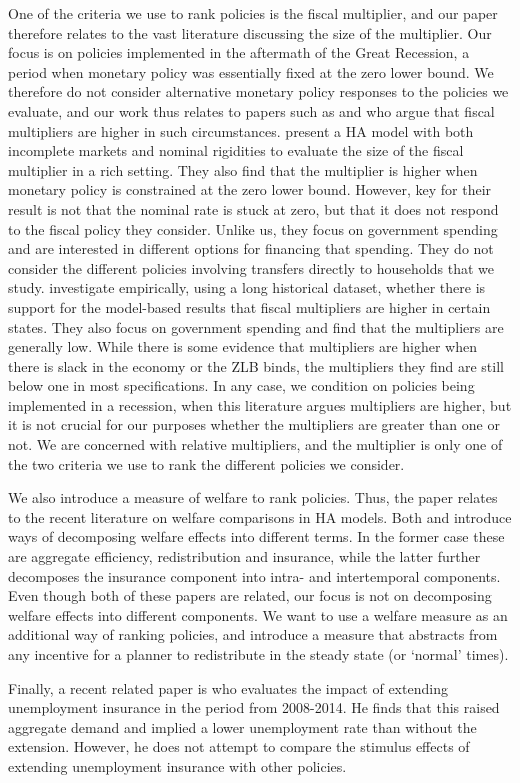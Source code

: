 \documentclass[../HAFiscal]{subfiles}
\begin{document}
One of the criteria we use to rank policies is the fiscal multiplier, and our paper therefore relates to the vast literature discussing the size of the multiplier. Our focus is on policies implemented in the aftermath of the Great Recession, a period when monetary policy was essentially fixed at the zero lower bound. We therefore do not consider alternative monetary policy responses to the policies we evaluate, and our work thus relates to papers such as \cite{christiano2011government} and \cite{eggertsson2011fiscal} who argue that fiscal multipliers are higher in such circumstances. \cite{hagedorn2019fiscal} present a HA model with both incomplete markets and nominal rigidities to evaluate the size of the fiscal multiplier in a rich setting. They also find that the multiplier is higher when monetary policy is constrained at the zero lower bound. However, key for their result is not that the nominal rate is stuck at zero, but that it does not respond to the fiscal policy they consider. Unlike us, they focus on government spending and are interested in different options for financing that spending. They do not consider the different policies involving transfers directly to households that we study. \cite{ramey2018government} investigate empirically, using a long historical dataset, whether there is support for the model-based results that fiscal multipliers are higher in certain states. They also focus on government spending and find that the multipliers are generally low. While there is some evidence that multipliers are higher when there is slack in the economy or the ZLB binds, the multipliers they find are still below one in most specifications. In any case, we condition on policies being implemented in a recession, when this literature argues multipliers are higher, but it is not crucial for our purposes whether the multipliers are greater than one or not. We are concerned with relative multipliers, and the multiplier is only one of the two criteria we use to rank the different policies we consider. 

We also introduce a measure of welfare to rank policies. Thus, the paper relates to the recent literature on welfare comparisons in HA models. Both \cite{bhandari2021efficiency} and \cite{davila2022welfare} introduce ways of decomposing welfare effects into different terms. In the former case these are aggregate efficiency, redistribution and insurance, while the latter further decomposes the insurance component into intra- and intertemporal components. Even though both of these papers are related, our focus is not on decomposing welfare effects into different components. We want to use a welfare measure as an additional way of ranking policies, and introduce a measure that abstracts from any incentive for a planner to redistribute in the steady state (or `normal' times).

Finally, a recent related paper is \cite{kekre2022unemployment} who evaluates the impact of extending unemployment insurance in the period from 2008-2014. He finds that this raised aggregate demand and implied a lower unemployment rate than without the extension. However, he does not attempt to compare the stimulus effects of extending unemployment insurance with other policies. 

\onlyinsubfile{}
\end{document}

